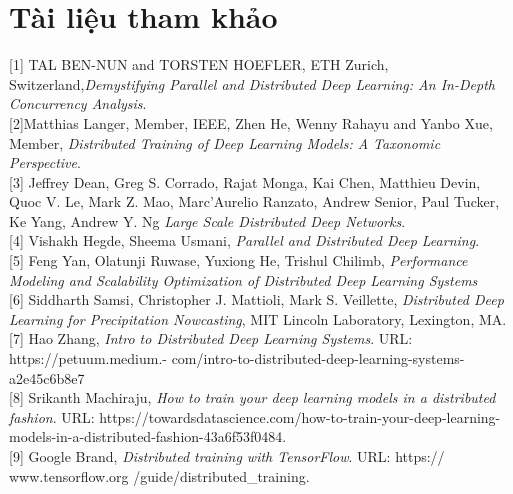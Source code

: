 \documentclass[11pt,a4paper]{article}
\numberwithin{equation}{subsection}
\numberwithin{figure}{subsection}
\numberwithin{table}{subsection}
\begin{document}
\newpage
\section*{Tài liệu tham khảo}

[1] TAL BEN-NUN and TORSTEN HOEFLER, ETH Zurich, Switzerland,\textit{Demystifying Parallel and Distributed Deep Learning: An In-Depth Concurrency Analysis}. \\

[2]Matthias Langer, Member, IEEE, Zhen He, Wenny Rahayu and Yanbo Xue, Member, \textit{Distributed Training of Deep Learning Models: A Taxonomic Perspective}. \\

[3] Jeffrey Dean, Greg S. Corrado, Rajat Monga, Kai Chen, Matthieu Devin, Quoc V. Le, Mark Z. Mao, Marc’Aurelio Ranzato, Andrew Senior, Paul Tucker, Ke Yang, Andrew Y. Ng \textit{Large Scale Distributed Deep Networks}. \\

[4] Vishakh Hegde, Sheema Usmani, \textit{Parallel and Distributed Deep Learning}.\\

[5] Feng Yan, Olatunji Ruwase, Yuxiong He, Trishul Chilimb, \textit{Performance Modeling and Scalability Optimization of Distributed Deep Learning Systems}\\

[6] Siddharth Samsi, Christopher J. Mattioli, Mark S. Veillette, \textit{Distributed Deep Learning for Precipitation Nowcasting}, MIT Lincoln Laboratory, Lexington, MA.\\

[7] Hao Zhang, \textit{Intro to Distributed Deep Learning Systems}. URL: https://petuum.medium.- com/intro-to-distributed-deep-learning-systems-a2e45c6b8e7\\

[8] Srikanth Machiraju, \textit{How to train your deep learning models in a distributed fashion}. URL: https://towardsdatascience.com/how-to-train-your-deep-learning-models-in-a-distributed-fashion-43a6f53f0484.\\

[9] Google Brand, \textit{Distributed training with TensorFlow}. URL: https://   www.tensorflow.org /guide/distributed\_training.
\end{document}
